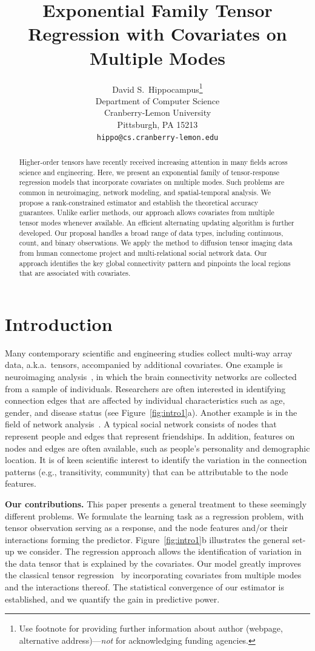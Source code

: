 \documentclass{article}
\title{Exponential Family Tensor Regression with Covariates on Multiple Modes }
\author{%
  David S.~Hippocampus\thanks{Use footnote for providing further information
    about author (webpage, alternative address)---\emph{not} for acknowledging
    funding agencies.} \\
  Department of Computer Science\\
  Cranberry-Lemon University\\
  Pittsburgh, PA 15213 \\
  \texttt{hippo@cs.cranberry-lemon.edu} \\

}
\theoremstyle{plain}
\theoremstyle{definition}
\begin{document}
\maketitle

\begin{abstract}
Higher-order tensors have recently received increasing attention in many fields across science and engineering. Here, we present an exponential family of tensor-response regression models that incorporate covariates on multiple modes. Such problems are common in neuroimaging, network modeling, and spatial-temporal analysis. We propose a rank-constrained estimator and establish the theoretical accuracy guarantees. Unlike earlier methods, our approach allows covariates from multiple tensor modes whenever available. An efficient alternating updating algorithm is further developed. Our proposal handles a broad range of data types, including continuous, count, and binary observations. We apply the method to diffusion tensor imaging data from human connectome project and multi-relational social network data. Our approach identifies the key global connectivity pattern and pinpoints the local regions that are associated with covariates.
\end{abstract}

\section{Introduction}

Many contemporary scientific and engineering studies collect multi-way array data, a.k.a.\ tensors, accompanied by additional covariates. One example is neuroimaging analysis~\cite{sun2017store,zhou2013tensor}, in which the brain connectivity networks are collected from a sample of individuals. Researchers are often interested in identifying connection edges that are affected by individual characteristics such as age, gender, and disease status (see Figure~\ref{fig:intro1}a). Another example is in the field of network analysis~\cite{baldin2018optimal,hoff2005bilinear}. A typical social network consists of nodes that represent people and edges that represent friendships. In addition, features on nodes and edges are often available, such as people's personality and demographic location. It is of keen scientific interest to identify the variation in the connection patterns (e.g., transitivity, community) that can be attributable to the node features.  

{\bf Our contributions.} This paper presents a general treatment to these seemingly different problems. We formulate the learning task as a regression problem, with tensor observation serving as a response, and the node features and/or their interactions forming the predictor. Figure~\ref{fig:intro1}b illustrates the general set-up we consider. The regression approach allows the identification of variation in the data tensor that is explained by the covariates. Our model greatly improves the classical tensor regression~\cite{rabusseau2016low,yu2016learning} by incorporating covariates from multiple modes and the interactions thereof. The statistical convergence of our estimator is established, and we quantify the gain in predictive power. 
\end{document}

